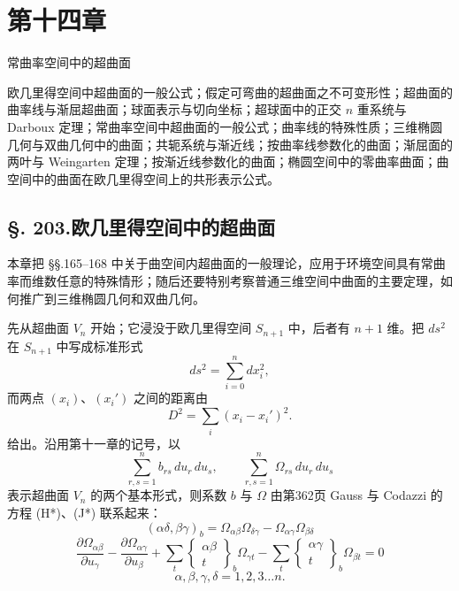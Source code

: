 \section*{第十四章}
\begin{center}
\large 常曲率空间中的超曲面
\end{center}

\oldquote
欧几里得空间中超曲面的一般公式；假定可弯曲的超曲面之不可变形性；超曲面的曲率线与渐屈超曲面；球面表示与切向坐标；超球面中的正交 $n$ 重系统与 Darboux 定理；常曲率空间中超曲面的一般公式；曲率线的特殊性质；三维椭圆几何与双曲几何中的曲面；共轭系统与渐近线；按曲率线参数化的曲面；渐屈面的两叶与 Weingarten 定理；按渐近线参数化的曲面；椭圆空间中的零曲率曲面；曲空间中的曲面在欧几里得空间上的共形表示公式。
\closeoldquote

\subsection*{\S. 203.\quad 欧几里得空间中的超曲面}

本章把 \S\S.165--168 中关于曲空间内超曲面的一般理论，应用于环境空间具有常曲率而维数任意的特殊情形；随后还要特别考察普通三维空间中曲面的主要定理，如何推广到三维椭圆几何和双曲几何。

先从超曲面 $V_n$ 开始；它浸没于欧几里得空间 $S_{n+1}$ 中，后者有 $n+1$ 维。把 $ds^2$ 在 $S_{n+1}$ 中写成标准形式
\[
ds^2=\sum_{i=0}^{n} dx_i^2,
\]
而两点 $(x_i)$、$(x_i')$ 之间的距离由
\[
D^2=\sum_i (x_i-x_i')^2.
\]
给出。沿用第十一章的记号，以
\[
\sum_{r,s=1}^{n} b_{rs}\,du_r\,du_s,\qquad
\sum_{r,s=1}^{n} \Omega_{rs}\,du_r\,du_s
\]
表示超曲面 $V_n$ 的两个基本形式，则系数 $b$ 与 $\Omega$ 由第362页 Gauss 与 Codazzi 的方程 (H*)、(J*) 联系起来：
\[
\tag{I}
(\alpha\delta,\beta\gamma)_b=\Omega_{\alpha\beta}\Omega_{\delta\gamma}-\Omega_{\alpha\gamma}\Omega_{\beta\delta}
\]
\[
\tag{II}
\frac{\partial\Omega_{\alpha\beta}}{\partial u_\gamma}
-\frac{\partial\Omega_{\alpha\gamma}}{\partial u_\beta}
+\sum_t\left\{\begin{matrix}\alpha\beta\\ t\end{matrix}\right\}_b\Omega_{\gamma t}
-\sum_t\left\{\begin{matrix}\alpha\gamma\\ t\end{matrix}\right\}_b\Omega_{\beta t}=0
\]
\[
\alpha,\beta,\gamma,\delta=1,2,3\ldots n .
\]

